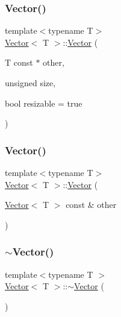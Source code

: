 \mbox{\label{classVector_a363b28b2093e32cb4ee93148c065782b}} 
\subsubsection{\texorpdfstring{Vector()}{Vector()}\hspace{0.1cm}{\footnotesize\ttfamily [2/3]}}
{\footnotesize\ttfamily template$<$typename T$>$ \\
\hyperlink{classVector}{Vector}$<$ T $>$\+::\hyperlink{classVector}{Vector} (\begin{DoxyParamCaption}\item[{T const $\ast$}]{other,  }\item[{unsigned}]{size,  }\item[{bool}]{resizable = {\ttfamily true} }\end{DoxyParamCaption})}

\mbox{\label{classVector_a857e13a3af4fb6e3eea77935cfcd4ef2}} 
\subsubsection{\texorpdfstring{Vector()}{Vector()}\hspace{0.1cm}{\footnotesize\ttfamily [3/3]}}
{\footnotesize\ttfamily template$<$typename T$>$ \\
\hyperlink{classVector}{Vector}$<$ T $>$\+::\hyperlink{classVector}{Vector} (\begin{DoxyParamCaption}\item[{\hyperlink{classVector}{Vector}$<$ T $>$ const \&}]{other }\end{DoxyParamCaption})}

\mbox{\label{classVector_afd524fac19e6d3d69db5198ffe2952b0}} 
\subsubsection{\texorpdfstring{$\sim$\+Vector()}{~Vector()}}
{\footnotesize\ttfamily template$<$typename T $>$ \\
\hyperlink{classVector}{Vector}$<$ T $>$\+::$\sim$\hyperlink{classVector}{Vector} (\begin{DoxyParamCaption}{ }\end{DoxyParamCaption})}



